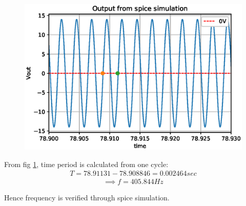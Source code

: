 \begin{enumerate}[label=\arabic*.,ref=\theenumi]
\begin{figure}[!ht]
\centering
\includegraphics[width=\columnwidth]{./figs/ee18btech11050/ee18btech11050_sim2.eps}
\caption{}
\label{fig:ee18btech11050_f7}
\end{figure}

From fig \ref{fig:ee18btech11050_f7}, time period is calculated from one cycle:
\begin{align}
    T = 78.91131 - 78.908846 = 0.002464 sec
\end{align}
\begin{align}
    \implies f = 405.844 Hz
\end{align}

Hence frequency is verified through spice simulation.

\end{enumerate}
